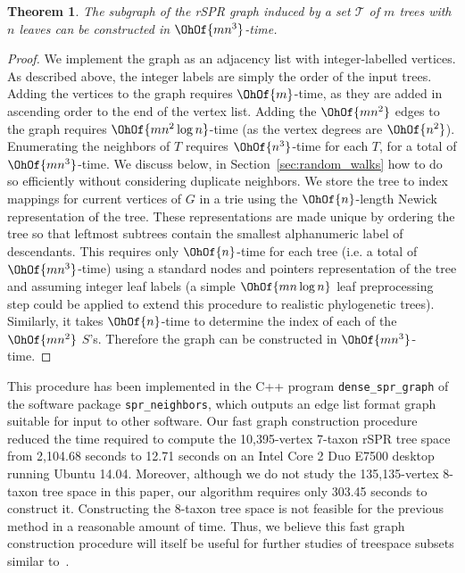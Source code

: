 \documentclass{amsart}
\newtheorem{theorem}{Theorem}[section]
\begin{document}
\begin{theorem}
	The subgraph of the rSPR graph induced by a set $\mathcal{T}$ of $m$ trees with $n$ leaves can be constructed in $\OhOf{mn^3}$-time.
\end{theorem}
\begin{proof}
	We implement the graph as an adjacency list with integer-labelled vertices.
	As described above, the integer labels are simply the order of the input trees.
	Adding the vertices to the graph requires $\OhOf{m}$-time, as they are added in ascending order to the end of the vertex list.
	Adding the $\OhOf{mn^2}$ edges to the graph requires $\OhOf{mn^2 \log n}$-time (as the vertex degrees are $\OhOf{n^2}$).
	Enumerating the neighbors of $T$ requires $\OhOf{n^3}$-time for each $T$, for a total of $\OhOf{mn^3}$-time.
	We discuss below, in Section~\ref{sec:random_walks} how to do so efficiently without considering duplicate neighbors.
	We store the tree to index mappings for current vertices of $G$ in a trie using the $\OhOf{n}$-length Newick representation of the tree.
	These representations are made unique by ordering the tree so that leftmost subtrees contain the smallest alphanumeric label of descendants.
	This requires only $\OhOf{n}$-time for each tree (i.e. a total of $\OhOf{mn^3}$-time) using a standard nodes and pointers representation of the tree and assuming integer leaf labels (a simple $\OhOf{mn\log n}$ leaf preprocessing step could be applied to extend this procedure to realistic phylogenetic trees).
	Similarly, it takes $\OhOf{n}$-time to determine the index of each of the $\OhOf{mn^2}$ $S$'s.
	Therefore the graph can be constructed in $\OhOf{mn^3}$-time.
\end{proof}
This procedure has been implemented in the C++ program \texttt{dense\_spr\_graph} of the software package \texttt{spr\_neighbors}, which outputs an edge list format graph suitable for input to other software. 
Our fast graph construction procedure reduced the time required to compute the 10,395-vertex 7-taxon rSPR tree space from 2,104.68 seconds to 12.71 seconds on an Intel Core 2 Duo E7500 desktop running Ubuntu 14.04.
Moreover, although we do not study the 135,135-vertex 8-taxon tree space in this paper, our algorithm requires only 303.45 seconds to construct it.
Constructing the 8-taxon tree space is not feasible for the previous method in a reasonable amount of time.
Thus, we believe this fast graph construction procedure will itself be useful for further studies of treespace subsets similar to~\cite{Whidden2015-yi}.
\end{document}
